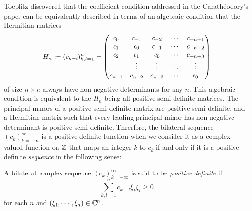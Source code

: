 \documentclass[a4paper]{article}
\begin{document}
Toeplitz discovered that the coefficient condition addressed in the Carath\'eodory's paper can be equivalently described in terms of an algebraic condition that the Hermitian matrices
\[H_n:=(c_{k-l})_{k,l=1}^n=\begin{pmatrix}c_0&c_{-1}&c_{-2}&\cdots&c_{-n+1}\\c_1&c_0&c_{-1}&\cdots&c_{-n+2}\\c_2&c_1&c_0&\cdots&c_{-n+3}\\\vdots&\vdots&\vdots&\ddots&\vdots\\c_{n-1}&c_{n-2}&c_{n-3}&\cdots&c_0\end{pmatrix}\]
of size $n\times n$ always have non-negative determinants for any $n$.
This algebraic condition is equivalent to the $H_n$ being all positive semi-definite matrices.
The principal minors of a positive semi-definite matrix are positive semi-definite, and a Hermitian matrix such that every leading principal minor has non-negative determinant is positive semi-definite.
Threrfore, the bilateral sequence $(c_k)_{k=-\infty}^\infty$ is a positive definite function when we consider it as a complex-valued function on $\mathbb{Z}$ that maps an integer $k$ to $c_k$ if and only if it is a positive definite \emph{sequence} in the following sense:

\begin{defn}
A bilateral complex sequence $(c_k)_{k=-\infty}^\infty$ is said to be \emph{positive definite} if
\[\sum_{k,l=1}^nc_{k-l}\xi_k\bar\xi_l\ge0\]
for each $n$ and $(\xi_1,\cdots,\xi_n)\in\mathbb{C}^n$.
\end{defn}
\end{document}
